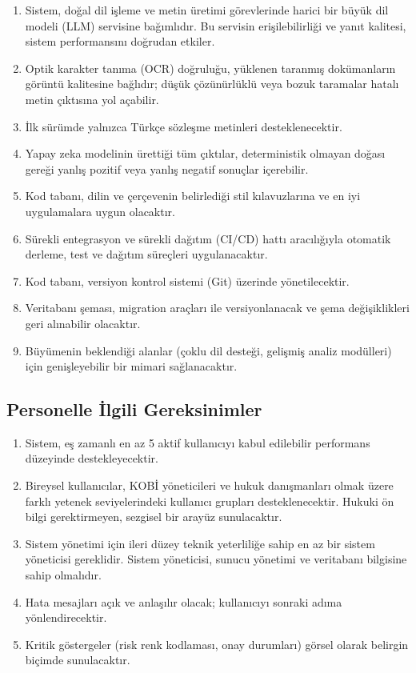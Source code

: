 \documentclass[12pt, a4paper]{article}
\begin{document}
\begin{enumerate}[leftmargin=2cm]
    \item Sistem, doğal dil işleme ve metin üretimi görevlerinde harici bir büyük dil modeli (LLM) servisine bağımlıdır. Bu servisin erişilebilirliği ve yanıt kalitesi, sistem performansını doğrudan etkiler.
    \item Optik karakter tanıma (OCR) doğruluğu, yüklenen taranmış dokümanların görüntü kalitesine bağlıdır; düşük çözünürlüklü veya bozuk taramalar hatalı metin çıktısına yol açabilir.
    \item İlk sürümde yalnızca Türkçe sözleşme metinleri desteklenecektir.
    \item Yapay zeka modelinin ürettiği tüm çıktılar, deterministik olmayan doğası gereği yanlış pozitif veya yanlış negatif sonuçlar içerebilir.
    \item Kod tabanı, dilin ve çerçevenin belirlediği stil kılavuzlarına ve en iyi uygulamalara uygun olacaktır.
    \item Sürekli entegrasyon ve sürekli dağıtım (CI/CD) hattı aracılığıyla otomatik derleme, test ve dağıtım süreçleri uygulanacaktır.
    \item Kod tabanı, versiyon kontrol sistemi (Git) üzerinde yönetilecektir.
    \item Veritabanı şeması, migration araçları ile versiyonlanacak ve şema değişiklikleri geri alınabilir olacaktır.
    \item Büyümenin beklendiği alanlar (çoklu dil desteği, gelişmiş analiz modülleri) için genişleyebilir bir mimari sağlanacaktır.
\end{enumerate}

\subsection{Personelle İlgili Gereksinimler}

\begin{enumerate}[leftmargin=2cm]
    \item Sistem, eş zamanlı en az 5 aktif kullanıcıyı kabul edilebilir performans düzeyinde destekleyecektir.
    \item Bireysel kullanıcılar, KOBİ yöneticileri ve hukuk danışmanları olmak üzere farklı yetenek seviyelerindeki kullanıcı grupları desteklenecektir. Hukuki ön bilgi gerektirmeyen, sezgisel bir arayüz sunulacaktır.
    \item Sistem yönetimi için ileri düzey teknik yeterliliğe sahip en az bir sistem yöneticisi gereklidir. Sistem yöneticisi, sunucu yönetimi ve veritabanı bilgisine sahip olmalıdır.
    \item Hata mesajları açık ve anlaşılır olacak; kullanıcıyı sonraki adıma yönlendirecektir.
    \item Kritik göstergeler (risk renk kodlaması, onay durumları) görsel olarak belirgin biçimde sunulacaktır.
\end{enumerate}
\end{document}
